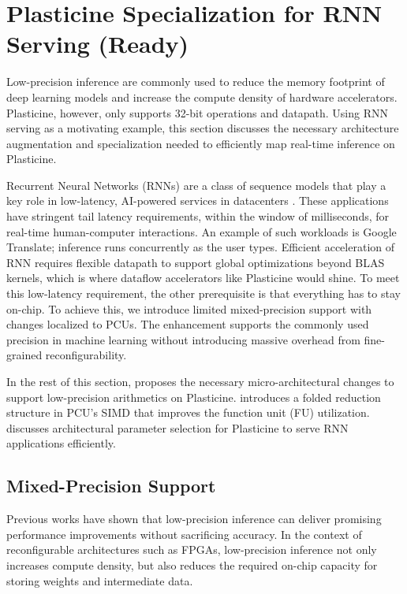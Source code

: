 \section{Plasticine Specialization for RNN Serving (Ready)} \label{sec:rnn_arch}

Low-precision inference are commonly used to reduce the memory footprint of deep learning models and
increase the compute density of hardware accelerators.
Plasticine, however, only supports 32-bit operations and datapath.
Using RNN serving as a motivating example, this section discusses the necessary architecture augmentation and
specialization needed to efficiently map real-time inference on Plasticine.

Recurrent Neural Networks (RNNs) are a class of sequence models that play a key role
in low-latency, AI-powered services in datacenters \cite{fowers2018configurable, jouppi2017datacenter}.
These applications have stringent tail latency requirements, within the window of milliseconds,
for real-time human-computer interactions.
An example of such workloads is
Google Translate; inference runs concurrently as the user types.
Efficient acceleration of RNN requires flexible datapath to support global optimizations beyond
BLAS kernels, which is where dataflow accelerators like Plasticine would shine.
To meet this low-latency requirement, the other prerequisite is that everything has to stay on-chip.
To achieve this, we introduce limited mixed-precision support with changes localized to PCUs. 
The enhancement supports the commonly used precision in machine learning without introducing massive
overhead from fine-grained reconfigurability.

In the rest of this section,  proposes the necessary micro-architectural changes to support low-precision arithmetics on Plasticine.
 introduces a folded reduction structure in PCU's SIMD that improves the function
unit (FU) utilization.
 discusses architectural parameter selection for Plasticine to serve RNN applications efficiently.

\subsection{Mixed-Precision Support} \label{sec:lowprec}
\label{sec:arch:varprec}
Previous works \cite{fowers2018configurable, jouppi2017datacenter}
  have shown that low-precision inference can deliver promising performance
  improvements without sacrificing accuracy.
In the context of reconfigurable architectures such as FPGAs,
  low-precision inference not only increases compute density,
  but also reduces the required on-chip capacity for
  storing weights and intermediate data.

